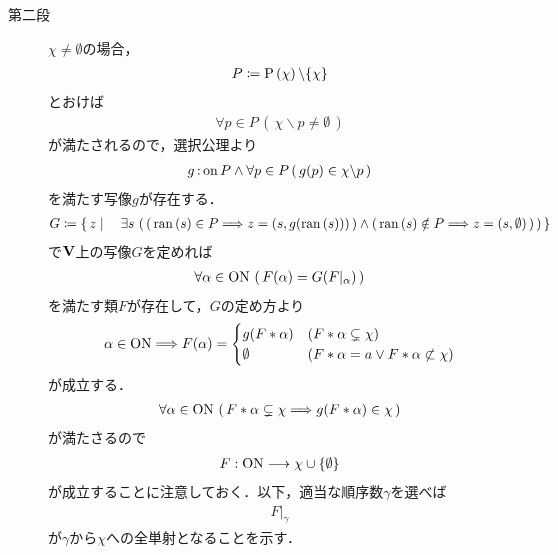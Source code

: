 \begin{prf}
\begin{description}
			\item[第二段]
				$\chi \neq \emptyset$の場合，
				\begin{align}
					P \coloneqq \operatorname*{P} \left(\chi\right) \backslash \{\chi\}
				\end{align}
				とおけば
				\begin{align}
					\forall p \in P\, (\, \chi \backslash p \neq \emptyset\, )
				\end{align}
				が満たされるので，選択公理より
				\begin{align}
					g \operatorname*{:on} P \wedge \forall p \in P\, (\, g(p) \in \chi \backslash p\, ) 
				\end{align}
				を満たす写像$g$が存在する．
				\begin{align}
					G \coloneqq \left\{\, z \mid \quad \exists s\, \left(\, 
						\left(\, \operatorname*{ran} \left(s\right) \in P \Longrightarrow z=(s,g(\operatorname*{ran} \left(s\right)))\, \right) 
						\wedge \left(\, \operatorname*{ran} \left(s\right) \notin P \Longrightarrow z=(s,\emptyset)\, \right)\, \right)\, \right\}
				\end{align}
				で$\mathbf{V}$上の写像$G$を定めれば
				\begin{align}
					\forall \alpha \in \mathrm{ON}\, \left(\, F(\alpha) = G(F|_\alpha)\, \right)
				\end{align}
				を満たす類$F$が存在して，$G$の定め方より
				\begin{align}
					\alpha \in \mathrm{ON} \Longrightarrow F(\alpha) = 
					\begin{cases}
						g(F \ast \alpha) & (F \ast \alpha \subsetneq \chi) \\
						\emptyset & (F \ast \alpha = a \vee F \ast \alpha \not\subset \chi)
					\end{cases}
				\end{align}
				が成立する．
				\begin{align}
					\forall \alpha \in \mathrm{ON}\, \left(\, 
					F \ast \alpha \subsetneq \chi \Longrightarrow g(F \ast \alpha) \in \chi\, \right)
				\end{align}
				が満たさるので
				\begin{align}
					F:\mathrm{ON} \longrightarrow \chi \cup \{\emptyset\}
				\end{align}
				が成立することに注意しておく．以下，適当な順序数$\gamma$を選べば
				\begin{align}
					F|_\gamma
				\end{align}
				が$\gamma$から$\chi$への全単射となることを示す．
			

\end{description}
\end{prf}

